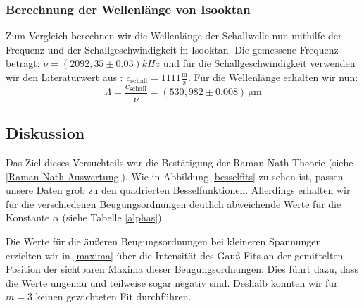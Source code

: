 \documentclass[12pt]{article}
\begin{document}
\subsubsection{Berechnung der Wellenlänge von Isooktan}\label{isooktanlit}
Zum Vergleich berechnen wir die Wellenlänge der Schallwelle nun mithilfe der Frequenz und der Schallgeschwindigkeit in Isooktan. Die gemessene Frequenz beträgt: $\nu=(2092,35\pm0.03)kHz$ und für die Schallgeschwindigkeit verwenden wir den Literaturwert aus \cite{staat}: $c_{\mathrm{schall}}=1111\mathrm{\frac{m}{s}}$.
Für die Wellenlänge erhalten wir nun: $$\Lambda=\frac{c_{\mathrm{schall}}}{\nu}=(530,982\pm0.008) \,\mathrm{\mu m}$$
\newpage
\subsection{Diskussion}
Das Ziel dieses Versuchteils war die Bestätigung der Raman-Nath-Theorie (siehe \ref{Raman-Nath-Auswertung}). Wie in Abbildung \ref{besselfits} zu sehen ist, passen unsere Daten grob zu den quadrierten Besselfunktionen. Allerdings erhalten wir für die verschiedenen Beugungsordnungen deutlich abweichende Werte für die Konstante $\alpha$ (siehe Tabelle \ref{alphas}). 
\begin{table}[h!]
\end{table}

Die Werte für die äußeren Beugungsordnungen bei kleineren Spannungen erzielten wir in \ref{maxima} über die Intensität des Gauß-Fits an der gemittelten Position der sichtbaren Maxima dieser Beugungsordnungen. Dies führt dazu, dass die Werte ungenau und teilweise sogar negativ sind. Deshalb konnten wir für $m=3$ keinen gewichteten Fit durchführen.\\
\end{document}
